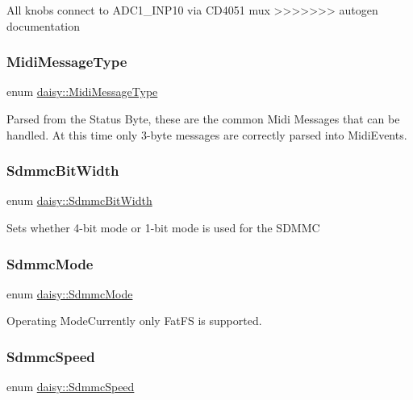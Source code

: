 All knobs connect to A\+D\+C1\+\_\+\+I\+N\+P10 via C\+D4051 mux \mbox{\label{namespacedaisy_aaf09bb687034c8776ca0c68ed3ed4179}} 
>>>>>>> autogen documentation
\subsubsection{\texorpdfstring{Midi\+Message\+Type}{MidiMessageType}}
{\footnotesize\ttfamily enum \hyperlink{namespacedaisy_aaf09bb687034c8776ca0c68ed3ed4179}{daisy\+::\+Midi\+Message\+Type}}

Parsed from the Status Byte, these are the common Midi Messages that can be handled. At this time only 3-\/byte messages are correctly parsed into Midi\+Events. \mbox{\label{namespacedaisy_a5df1c73d4f0fdbf01d987cef4c3b165e}} 
\subsubsection{\texorpdfstring{Sdmmc\+Bit\+Width}{SdmmcBitWidth}}
{\footnotesize\ttfamily enum \hyperlink{namespacedaisy_a5df1c73d4f0fdbf01d987cef4c3b165e}{daisy\+::\+Sdmmc\+Bit\+Width}}

Sets whether 4-\/bit mode or 1-\/bit mode is used for the S\+D\+M\+MC \mbox{\label{namespacedaisy_a06f91f8f9f006800c4b0cde1a650664b}} 
\subsubsection{\texorpdfstring{Sdmmc\+Mode}{SdmmcMode}}
{\footnotesize\ttfamily enum \hyperlink{namespacedaisy_a06f91f8f9f006800c4b0cde1a650664b}{daisy\+::\+Sdmmc\+Mode}}

Operating Mode\+Currently only Fat\+FS is supported. \mbox{\label{namespacedaisy_aa4d107ebcf4d77d94b63c90fdba9cf93}} 
\subsubsection{\texorpdfstring{Sdmmc\+Speed}{SdmmcSpeed}}
{\footnotesize\ttfamily enum \hyperlink{namespacedaisy_aa4d107ebcf4d77d94b63c90fdba9cf93}{daisy\+::\+Sdmmc\+Speed}}

